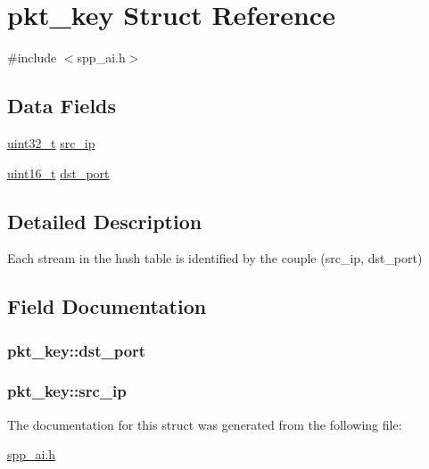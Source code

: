\hypertarget{structpkt__key}{
\section{pkt\_\-key Struct Reference}
\label{structpkt__key}
}


{\ttfamily \#include $<$spp\_\-ai.h$>$}

\subsection*{Data Fields}
\begin{DoxyCompactItemize}
\item 
\hyperlink{spp__ai_8h_a435d1572bf3f880d55459d9805097f62}{uint32\_\-t} \hyperlink{structpkt__key_a3a091c20dafb8b3f689db00c5b2f8ddb}{src\_\-ip}
\item 
\hyperlink{spp__ai_8h_a273cf69d639a59973b6019625df33e30}{uint16\_\-t} \hyperlink{structpkt__key_af77f5eb1f4cd88b43fe99fd73553351d}{dst\_\-port}
\end{DoxyCompactItemize}


\subsection{Detailed Description}
Each stream in the hash table is identified by the couple (src\_\-ip, dst\_\-port) 

\subsection{Field Documentation}
\hypertarget{structpkt__key_af77f5eb1f4cd88b43fe99fd73553351d}{
\subsubsection[{dst\_\-port}]{ {\bf pkt\_\-key::dst\_\-port}}}
\label{structpkt__key_af77f5eb1f4cd88b43fe99fd73553351d}
\hypertarget{structpkt__key_a3a091c20dafb8b3f689db00c5b2f8ddb}{
\subsubsection[{src\_\-ip}]{ {\bf pkt\_\-key::src\_\-ip}}}
\label{structpkt__key_a3a091c20dafb8b3f689db00c5b2f8ddb}


The documentation for this struct was generated from the following file:\begin{DoxyCompactItemize}
\item 
\hyperlink{spp__ai_8h}{spp\_\-ai.h}\end{DoxyCompactItemize}
